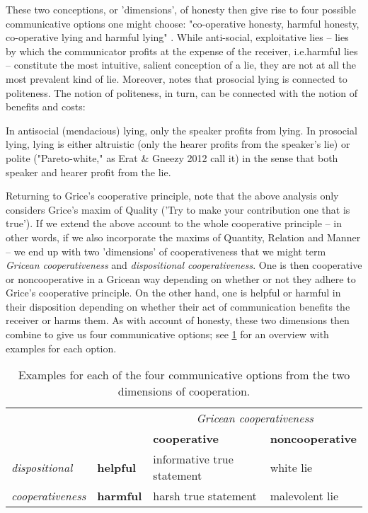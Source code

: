 These two conceptions, or 'dimensions', of honesty then give rise to four possible communicative options one might choose: "co-operative honesty, harmful honesty, co-operative lying and harmful lying" \citep[p.~45]{Dor17}.
While anti-social, exploitative lies -- lies by which the communicator profits at the expense of the receiver, i.e.\@ harmful lies -- constitute the most intuitive, salient conception of a lie, they are not at all the most prevalent kind of lie. Moreover, \citet{Meibauer18} notes that prosocial lying is connected to politeness. The notion of politeness, in turn, can be connected with the notion of benefits and costs:
\begin{quoting}
    In antisocial (mendacious) lying, only the speaker profits from lying. In prosocial lying, lying is either altruistic (only the hearer profits from the speaker's lie) or polite ("Pareto-white," as Erat \& Gneezy 2012 call it) in the sense that both speaker and hearer profit from the lie.
    \hfill \citep[p.~371]{Meibauer18}
\end{quoting}

Returning to Grice's cooperative principle, note that the above analysis only considers Grice's maxim of Quality ('Try to make your contribution one that is true'). If we extend the above account to the whole cooperative principle -- in other words, if we also incorporate the maxims of Quantity, Relation and Manner -- we end up with two 'dimensions' of cooperativeness that we might term \emph{Gricean cooperativeness} and \emph{dispositional cooperativeness}. One is then cooperative or noncooperative in a Gricean way depending on whether or not they adhere to Grice's cooperative principle. On the other hand, one is helpful or harmful in their disposition depending on whether their act of communication benefits the receiver or harms them.
As with  account of honesty,
these two dimensions then combine to give us four communicative options; see \cref{tab:dimensions-of-cooperation} for an overview with examples for each option.

\begin{table}[ht]
  \centering
\begin{tabular}{lll|l}
  \cline{3-4}
  & & \multicolumn{2}{c}{\emph{Gricean cooperativeness}} \\ \cline{3-4}
  & & \textbf{cooperative} & \textbf{noncooperative} \\ \hline
  \emph{dispositional} &
  \textbf{helpful} & informative true statement & white lie \\ \cline{2-4}
  \emph{cooperativeness} &
  \textbf{harmful} & harsh true statement & malevolent lie \\ \hline
\end{tabular}
\caption{Examples for each of the four communicative options from the two dimensions of cooperation.}
\label{tab:dimensions-of-cooperation}
\end{table}

